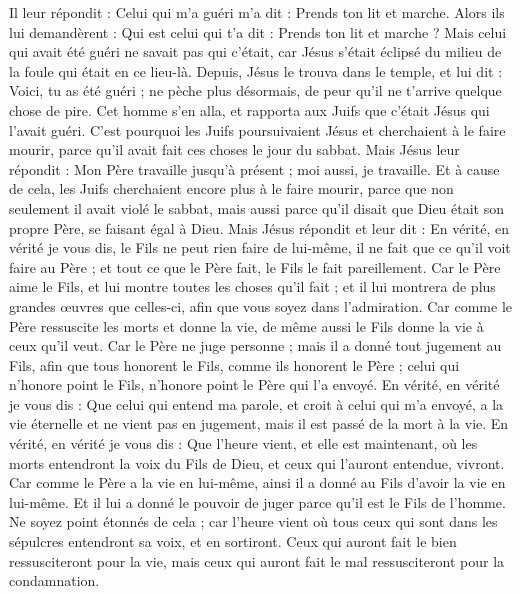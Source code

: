 \begin{multicols}{2}
Il leur répondit : Celui qui m'a guéri m'a dit : Prends ton lit et marche.
Alors ils lui demandèrent : Qui est celui qui t'a dit : Prends ton lit et marche ?
Mais celui qui avait été guéri ne savait pas qui c'était, car Jésus s'était éclipsé du milieu de la foule qui était en ce lieu-là.
Depuis, Jésus le trouva dans le temple, et lui dit : Voici, tu as été guéri ; ne pèche plus désormais, de peur qu'il ne t'arrive quelque chose de pire.
Cet homme s'en alla, et rapporta aux Juifs que c'était Jésus qui l'avait guéri.
C'est pourquoi les Juifs poursuivaient Jésus et cherchaient à le faire mourir, parce qu'il avait fait ces choses le jour du sabbat.
Mais Jésus leur répondit : Mon Père travaille jusqu'à présent ; moi aussi, je travaille.
Et à cause de cela, les Juifs cherchaient encore plus à le faire mourir, parce que non seulement il avait violé le sabbat, mais aussi parce qu'il disait que Dieu était son propre Père, se faisant égal à Dieu.
Mais Jésus répondit et leur dit : En vérité, en vérité je vous dis, le Fils ne peut rien faire de lui-même, il ne fait que ce qu'il voit faire au Père ; et tout ce que le Père fait, le Fils le fait pareillement.
Car le Père aime le Fils, et lui montre toutes les choses qu'il fait ; et il lui montrera de plus grandes œuvres que celles-ci, afin que vous soyez dans l'admiration.
Car comme le Père ressuscite les morts et donne la vie, de même aussi le Fils donne la vie à ceux qu'il veut.
Car le Père ne juge personne ; mais il a donné tout jugement au Fils,
afin que tous honorent le Fils, comme ils honorent le Père ; celui qui n'honore point le Fils, n'honore point le Père qui l'a envoyé.
En vérité, en vérité je vous dis : Que celui qui entend ma parole, et croit à celui qui m'a envoyé, a la vie éternelle et ne vient pas en jugement, mais il est passé de la mort à la vie.
En vérité, en vérité je vous dis : Que l'heure vient, et elle est maintenant, où les morts entendront la voix du Fils de Dieu, et ceux qui l'auront entendue, vivront.
Car comme le Père a la vie en lui-même, ainsi il a donné au Fils d'avoir la vie en lui-même.
Et il lui a donné le pouvoir de juger parce qu'il est le Fils de l'homme.
Ne soyez point étonnés de cela ; car l'heure vient où tous ceux qui sont dans les sépulcres entendront sa voix, et en sortiront.
 Ceux qui auront fait le bien ressusciteront pour la vie, mais ceux qui auront fait le mal ressusciteront pour la condamnation.

\end{multicols}
